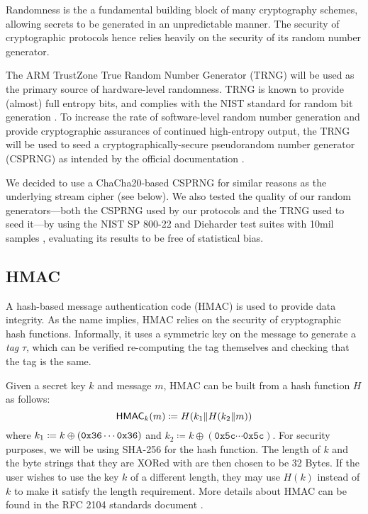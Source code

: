 Randomness is the a fundamental building block of many cryptography schemes, allowing secrets to be generated in an unpredictable manner.
\iflong
The security of cryptographic protocols hence relies heavily on the security of its random number generator.
\fi


The ARM TrustZone True Random Number Generator (TRNG) \cite{TRNG} will be used as the primary source of hardware-level randomness.
\iflong
TRNG is known to provide (almost) full entropy bits, and complies with the NIST standard for random bit generation \cite{NIST-TRNG}.
\fi
To increase the rate of software-level random number generation and provide cryptographic assurances of continued high-entropy output, the TRNG will be used to seed a cryptographically-secure pseudorandom number generator (CSPRNG) as intended by the official documentation \cite{TRNG}.

We decided to use a ChaCha20-based CSPRNG for similar reasons as the underlying stream cipher (see below). We also tested the quality of our random generators---both the CSPRNG used by our protocols and the TRNG used to seed it---by using the NIST SP 800-22 and Dieharder test suites\!\!
\iflong
with 10mil samples
\fi
, evaluating its results to be free of statistical bias.

\subsection{HMAC}

A hash-based message authentication code (HMAC) is used to provide data integrity. As the name implies, HMAC relies on the security of cryptographic hash functions. Informally, it uses a symmetric key on the message to generate a \textit{tag} $\tau$, which can be verified re-computing the tag themselves and checking that the tag is the same.

Given a secret key $k$ and message $m$, HMAC can be built from a hash function $H$ as follows:
$$
\mathsf{HMAC}_k(m) \coloneqq H(k_1 \| H(k_2 \| m))
$$
where $k_1 \coloneqq k \oplus (\texttt{0x36} \cdots \texttt{0x36})$ and $k_2 \coloneqq k \oplus (\texttt{0x5c}\cdots \texttt{0x5c})$. For security purposes, we will be using SHA-256 for the hash function.
\iflong
The length of $k$ and the byte strings that they are XORed with are then chosen to be 32 Bytes. If the user wishes to use the key $k$ of a different length, they may use $H(k)$ instead of $k$ to make it satisfy the length requirement.
\fi
More details about HMAC can be found in the RFC 2104 standards document \cite{rfc2104}. 

